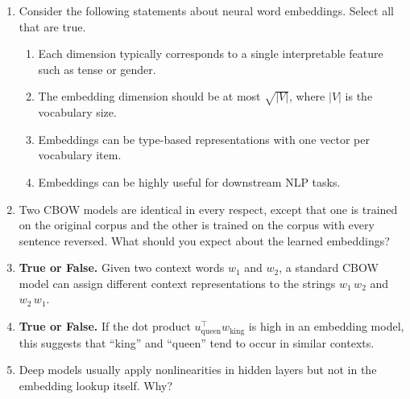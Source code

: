 \begin{enumerate}[label=(\alph*)]
\item Consider the following statements about neural word embeddings. Select all that are true.
\begin{enumerate}[label=\alph*.]
\item Each dimension typically corresponds to a single interpretable feature such as tense or gender.
\item The embedding dimension should be at most \(\sqrt{|V|}\), where \(|V|\) is the vocabulary size.
\item Embeddings can be type-based representations with one vector per vocabulary item.
\item Embeddings can be highly useful for downstream NLP tasks.
\end{enumerate}

\item Two CBOW models are identical in every respect, except that one is trained on the original corpus and the other is trained on the corpus with every sentence reversed. What should you expect about the learned embeddings?

\item \textbf{True or False.} Given two context words \(w_1\) and \(w_2\), a standard CBOW model can assign different context representations to the strings \(w_1\,w_2\) and \(w_2\,w_1\).

\item \textbf{True or False.} If the dot product \(u_{\text{queen}}^\top w_{\text{king}}\) is high in an embedding model, this suggests that ``king'' and ``queen'' tend to occur in similar contexts.

\item Deep models usually apply nonlinearities in hidden layers but not in the embedding lookup itself. Why?


\end{enumerate}
